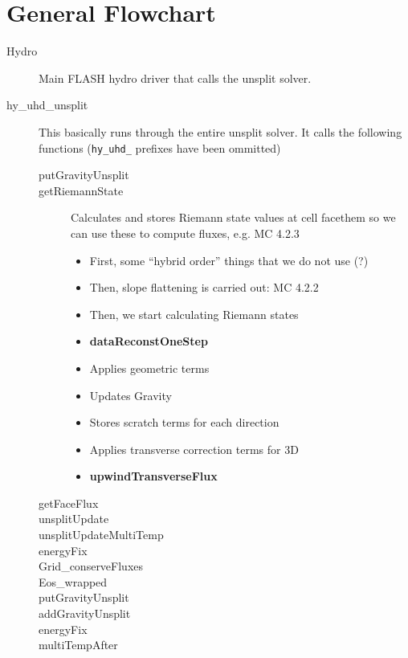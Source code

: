 \documentclass[preprint,11pt]{aastex}
\begin{document}
\section{General Flowchart}
\label{sec:flowchart}
\begin{description}
	\item[Hydro] Main FLASH hydro driver that calls the unsplit solver.
	\item[hy\_uhd\_unsplit] This basically runs through the entire unsplit solver.  It calls the following functions (\verb!hy_uhd_! prefixes have been ommitted)
	\begin{description}
		\item[putGravityUnsplit]
		\item[getRiemannState]  Calculates and stores Riemann state values at cell facethem so we can use these to compute fluxes, e.g. MC 4.2.3
		\begin{itemize}
			\item First, some "`hybrid order"' things that we do not use (?)
			\item Then, slope flattening is carried out: MC 4.2.2
			\item Then, we start calculating Riemann states
			\item \textbf{dataReconstOneStep}
			\item Applies geometric terms
			\item Updates Gravity
			\item Stores scratch terms for each direction
			\item Applies transverse correction terms for 3D
			\item \textbf{upwindTransverseFlux}
		\end{itemize}
		\item[getFaceFlux]
		\item[unsplitUpdate]
		\item[unsplitUpdateMultiTemp]
		\item[energyFix]
		\item[Grid\_conserveFluxes]
		\item[Eos\_wrapped]
		\item[putGravityUnsplit]
		\item[addGravityUnsplit]
		\item[energyFix]
		\item[multiTempAfter]

	
	\end{description}
	
\end{description}
\end{document}
